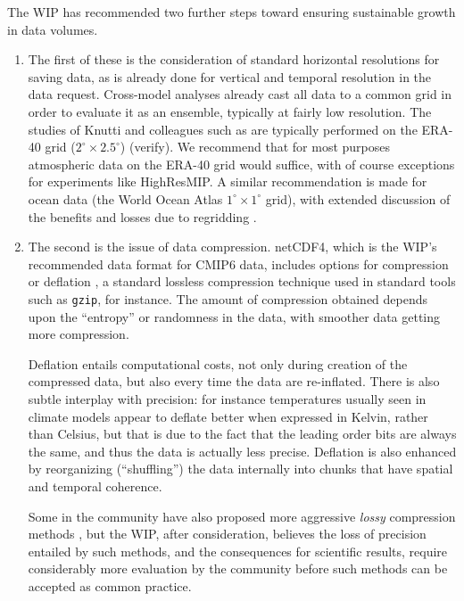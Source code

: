 \documentclass[gmd,manuscript]{copernicus}
\newcommand{\bibref}[1] { \cite{ref:#1}}
\newcommand{\pipref}[1] {\citep{ref:#1}}
\begin{document}
The WIP has recommended two further steps toward ensuring sustainable
growth in data volumes.

\begin{enumerate}
\item The first of these is the consideration of standard horizontal
  resolutions for saving data, as is already done for vertical and
  temporal resolution in the data request. Cross-model analyses
  already cast all data to a common grid in order to evaluate it as an
  ensemble, typically at fairly low resolution. The studies of Knutti
  and colleagues such as \bibref{knuttietal2017} are typically
  performed on the ERA-40 grid ($2^\circ\times 2.5^\circ$) (verify).
  We recommend that for most purposes atmospheric data on the ERA-40
  grid would suffice, with of course exceptions for experiments like
  HighResMIP. A similar recommendation is made for ocean data (the
  World Ocean Atlas $1^\circ\times 1^\circ$ grid), with extended
  discussion of the benefits and losses due to regridding
  \citep[see][]{ref:griffiesetal2014,ref:griffiesetal2016}.
\item The second is the issue of data compression. netCDF4, which is
  the WIP's recommended data format for CMIP6 data, includes options
  for compression or deflation \pipref{zivlempel1977}, a
  standard lossless compression technique used in standard tools such
  as \texttt{gzip}, for instance. The amount of compression obtained
  depends upon the ``entropy'' or randomness in the data, with
  smoother data getting more compression.

  Deflation entails computational costs, not only during creation of
  the compressed data, but also every time the data are re-inflated.
  There is also subtle interplay with precision: for instance
  temperatures usually seen in climate models appear to deflate better
  when expressed in Kelvin, rather than Celsius, but that is due to
  the fact that the leading order bits are always the same, and thus
  the data is actually less precise. Deflation is also enhanced by
  reorganizing (``shuffling'') the data internally into chunks that
  have spatial and temporal coherence.

  Some in the community have also proposed more aggressive
  \emph{lossy} compression methods \pipref{bakeretal2016}, but the
  WIP, after consideration, believes the loss of precision entailed by
  such methods, and the consequences for scientific results, require
  considerably more evaluation by the community before such methods
  can be accepted as common practice.


\end{enumerate}
\end{document}
